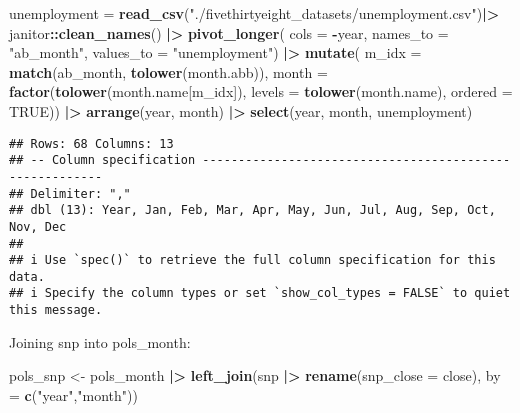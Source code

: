 \documentclass[
]{article}
\newenvironment{Shaded}{\begin{snugshade}}{\end{snugshade}}
\newcommand{\AttributeTok}[1]{\textcolor[rgb]{0.13,0.29,0.53}{#1}}
\newcommand{\ConstantTok}[1]{\textcolor[rgb]{0.56,0.35,0.01}{#1}}
\newcommand{\FunctionTok}[1]{\textcolor[rgb]{0.13,0.29,0.53}{\textbf{#1}}}
\newcommand{\NormalTok}[1]{#1}
\newcommand{\OtherTok}[1]{\textcolor[rgb]{0.56,0.35,0.01}{#1}}
\newcommand{\SpecialCharTok}[1]{\textcolor[rgb]{0.81,0.36,0.00}{\textbf{#1}}}
\newcommand{\StringTok}[1]{\textcolor[rgb]{0.31,0.60,0.02}{#1}}
\begin{document}
\begin{Shaded}
\begin{Highlighting}[]
\NormalTok{unemployment }\OtherTok{=}
  \FunctionTok{read\_csv}\NormalTok{(}\StringTok{"./fivethirtyeight\_datasets/unemployment.csv"}\NormalTok{)}\SpecialCharTok{|\textgreater{}}
\NormalTok{  janitor}\SpecialCharTok{::}\FunctionTok{clean\_names}\NormalTok{() }\SpecialCharTok{|\textgreater{}}
  \FunctionTok{pivot\_longer}\NormalTok{(}
    \AttributeTok{cols =} \SpecialCharTok{{-}}\NormalTok{year,}
    \AttributeTok{names\_to  =} \StringTok{"ab\_month"}\NormalTok{,}
    \AttributeTok{values\_to =} \StringTok{"unemployment"}\NormalTok{) }\SpecialCharTok{|\textgreater{}}
  \FunctionTok{mutate}\NormalTok{(}
    \AttributeTok{m\_idx =} \FunctionTok{match}\NormalTok{(ab\_month, }\FunctionTok{tolower}\NormalTok{(month.abb)),             }
    \AttributeTok{month =} \FunctionTok{factor}\NormalTok{(}\FunctionTok{tolower}\NormalTok{(month.name[m\_idx]),}
                   \AttributeTok{levels =} \FunctionTok{tolower}\NormalTok{(month.name), }\AttributeTok{ordered =} \ConstantTok{TRUE}\NormalTok{)) }\SpecialCharTok{|\textgreater{}}
  \FunctionTok{arrange}\NormalTok{(year, month) }\SpecialCharTok{|\textgreater{}}
  \FunctionTok{select}\NormalTok{(year, month, unemployment)}
\end{Highlighting}
\end{Shaded}

\begin{verbatim}
## Rows: 68 Columns: 13
## -- Column specification --------------------------------------------------------
## Delimiter: ","
## dbl (13): Year, Jan, Feb, Mar, Apr, May, Jun, Jul, Aug, Sep, Oct, Nov, Dec
## 
## i Use `spec()` to retrieve the full column specification for this data.
## i Specify the column types or set `show_col_types = FALSE` to quiet this message.
\end{verbatim}

Joining snp into pols\_month:

\begin{Shaded}
\begin{Highlighting}[]
\NormalTok{pols\_snp }\OtherTok{\textless{}{-}}\NormalTok{ pols\_month }\SpecialCharTok{|\textgreater{}}
  \FunctionTok{left\_join}\NormalTok{(snp }\SpecialCharTok{|\textgreater{}} \FunctionTok{rename}\NormalTok{(}\AttributeTok{snp\_close =}\NormalTok{ close),}
            \AttributeTok{by =} \FunctionTok{c}\NormalTok{(}\StringTok{"year"}\NormalTok{,}\StringTok{"month"}\NormalTok{))}
\end{Highlighting}
\end{Shaded}
\end{document}
